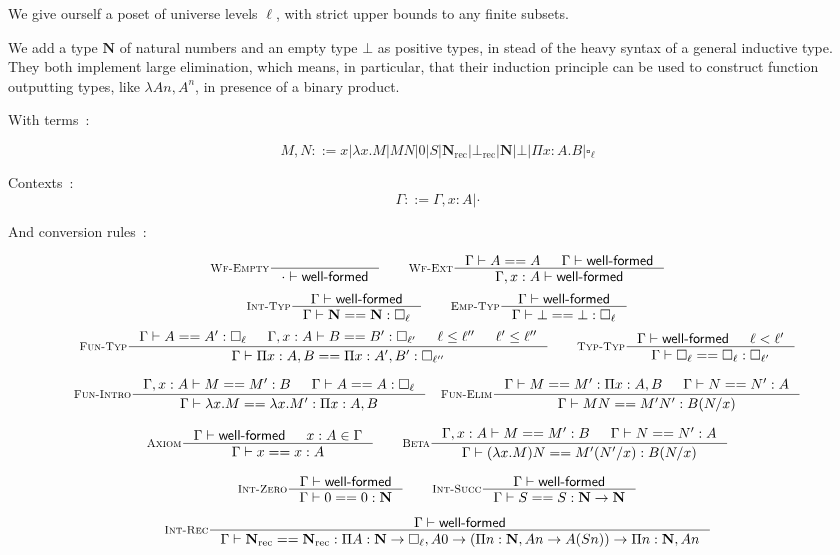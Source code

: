 \documentclass[11pt]{article}
\DeclareMathOperator{\rec}{rec}
\newcommand{\0}{\mathbf{0}}
\newcommand{\1}{\mathbf{1}}
\newcommand{\nat}{\mathbf{N}}
\newcommand{\tctx}{\Gamma}
\newcommand{\Wf}{\textsf{well-formed}}
\begin{document}
We give ourself a poset of universe levels $\ell$, with strict upper bounds to any finite subsets.

We add a type $\nat$ of natural numbers and an empty type $\bot$ as positive types, in stead of the heavy syntax of a general inductive type. They both implement large elimination, which means, in particular, that their induction principle can be used to construct function outputting types, like $\lambda A n, A^n$, in presence of a binary product.

With terms~:

$$ M,N ::= x | \lambda x. M | MN | 0 | S | \nat_{\rec} | \bot_{\rec} | \nat | \bot | \Pi x :A.B | \square_\ell $$


Contexts~:
$$ \tctx ::= \tctx, x : A | \cdot $$

And conversion rules~:

$$
    \inference[\textsc{Wf-Empty}]{}{\cdot |- \Wf} \qquad
    \inference[\textsc{Wf-Ext}]{\tctx |- A == A & \tctx |- \Wf}{ \tctx, x : A |- \Wf}
$$
$$
    \inference[\textsc{Int-Typ}]{\tctx |- \Wf}{\tctx |- \nat == \nat : \square_\ell} \qquad
    \inference[\textsc{Emp-Typ}]{\tctx |- \Wf}{\tctx |- \bot == \bot : \square_\ell}
$$
$$
    \inference[\textsc{Fun-Typ}]{\tctx |- A == A' : \square_\ell & \tctx, x : A |- B == B' : \square_{\ell'} & \ell \leq \ell'' & \ell' \leq \ell''}{\tctx |- \Pi x  : A, B == \Pi x: A', B' : \square_{\ell''}} \qquad
    \inference[\textsc{Typ-Typ}]{\tctx |- \Wf & \ell < \ell' }{\tctx |- \square_\ell == \square_\ell: \square_{\ell'}}
$$


$$
    \inference[\textsc{Fun-Intro}]{\tctx, x : A |- M == M' : B &\tctx |- A == A : \square_\ell}{\tctx |- \lambda x. M == \lambda x. M' : \Pi x : A, B} \quad
    \inference[\textsc{Fun-Elim}]{\tctx |- M == M' : \Pi x:A, B& \tctx |- N == N' : A}{\tctx |- MN == M'N' : B(N/x)}
$$

$$
    \inference[\textsc{Axiom}]{\tctx |- \Wf & x : A \in \tctx }{\tctx |- x == x : A} \qquad
    \inference[\textsc{Beta}]{\tctx, x : A |- M == M' : B & \tctx |- N == N' : A}{\tctx |- (\lambda x. M)N == M'(N'/x) : B(N/x)}
$$

$$
    \inference[\textsc{Int-Zero}]{\tctx |- \Wf}{\tctx |- 0 == 0 : \nat} \qquad
    \inference[\textsc{Int-Succ}]{\tctx |- \Wf}{\tctx |- S == S : \nat -> \nat}
$$

$$
    \inference[\textsc{Int-Rec}]{\tctx |- \Wf}{\tctx |- \nat_{\rec} == \nat_{\rec} : \Pi A : \nat \to \square_\ell, A 0 \to \left(\Pi n:\nat, A n \to A (S n)\right) \to \Pi n :\nat, A n}
$$
\end{document}
